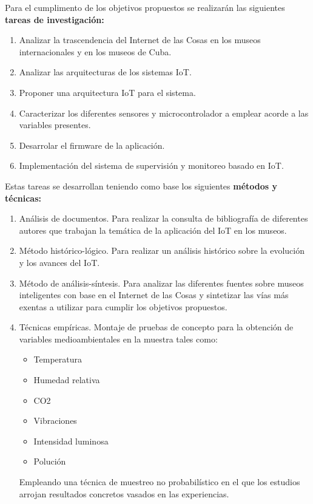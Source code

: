     \newpage
    
    Para el cumplimento de los objetivos propuestos se realizarán las siguientes \textbf{tareas de investigación:}

    \begin{enumerate} %
        \item Analizar la trascendencia del Internet de las Cosas en los museos internacionales y en los museos de Cuba.
        \item Analizar las arquitecturas de los sistemas IoT.
        \item Proponer una arquitectura IoT para el sistema.
        \item Caracterizar los diferentes sensores y microcontrolador a emplear acorde a las variables presentes.
        \item Desarrolar el firmware de la aplicación.
        \item Implementación del sistema de supervisión y monitoreo basado en IoT.
    \end{enumerate}

    Estas tareas se desarrollan teniendo como base los siguientes \textbf{métodos y técnicas:}

    \begin{enumerate}
        \item Análisis de documentos. Para realizar la consulta de bibliografía de diferentes autores que trabajan la temática de la aplicación del IoT en los museos.
        \item Método histórico-lógico. Para realizar un análisis histórico sobre la evolución y los avances del IoT.
        \item Método de análisis-síntesis. Para analizar las diferentes fuentes sobre museos inteligentes con base en el Internet de las Cosas y sintetizar las vías más exentas a utilizar para cumplir los objetivos propuestos.
        \item Técnicas empíricas. Montaje de pruebas de concepto para la obtención de variables medioambientales en la muestra tales como:
            \begin{itemize}
                \item Temperatura
                \item Humedad relativa
                \item CO2
                \item Vibraciones
                \item Intensidad luminosa
                \item Polución
            \end{itemize}
            Empleando una técnica de muestreo no probabilístico en el que los estudios arrojan resultados concretos vasados en las experiencias.
    \end{enumerate}

